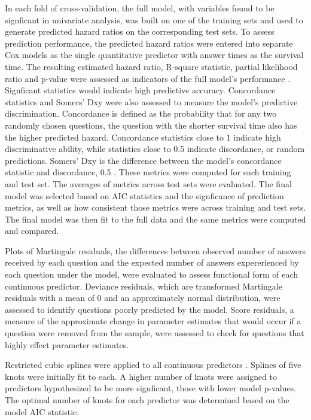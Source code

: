 \documentclass[12pt]{article}
\begin{document}
In each fold of cross-validation, the full model, with variables found to be signficant in univariate analysis, was built on one of the training sets and used to generate predicted hazard ratios on the corresponding test sets. To assess prediction performance, the predicted hazard ratios were entered into separate Cox models as the single quantitative predictor with answer times as the survival time. The resulting estimated hazard ratio, R-square statistic, partial likelihood ratio and p-value were assessed as indicators of the full model's performance \citep{Chen}. Signficant statistics would indicate high predictive accuracy. Concordance statistics and Somers' Dxy were also assessed to measure the model's predictive discrimination. Concordance is defined as the probability that for any two randomly chosen questions, the question with the shorter survival time also has the higher predicted hazard. Concordance statistics close to 1 indicate high discriminative ability, while statistics close to 0.5 indicate discordance, or random predictions. Somers' Dxy is the difference between the model's concordance statistic and discordance, 0.5 \citep{Harrell2015}. These metrics were computed for each training and test set. The averages of metrics across test sets were evaluated. The final model was selected based on AIC statistics and the signficance of prediction metrics, as well as how consistent those metrics were across training and test sets. The final model was then fit to the full data and the same metrics were computed and compared. 

Plots of Martingale residuals, the differences between observed number of answers received by each question and the expected number of answers expererienced by each question under the model, were evaluated to assess functional form of each continuous predictor. Deviance residuals, which are transformed Martingale residuals with a mean of 0 and an approximately normal distribution, were assessed to identify questions poorly predicted by the model. Score residuals, a measure of the approximate change in parameter estimates that would occur if a question were removed from the sample, were assessed to check for questions that highly effect parameter estimates. 

Restricted cubic splines were applied to all continuous predictors \citep{Harrell2015}. Splines of five knots were initially fit to each. A higher number of knots were assigned to predictors hypothesized to be more signficant, those with lower model p-values. The optimal number of knots for each predictor was determined based on the model AIC statistic. 
\end{document}
